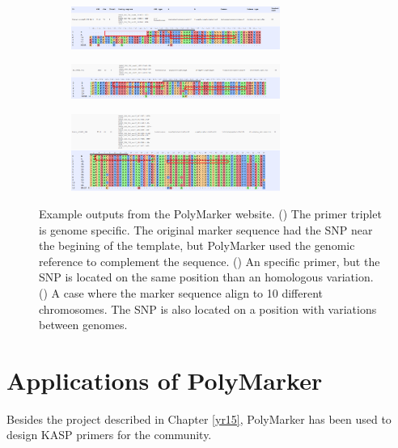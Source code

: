 \begin{figure}
\centering
\begin{subfigure}{1\textwidth}
\caption{}
\label{fig:poly:non-hom-sp}
\includegraphics[width=0.75\textwidth]{PolyMarker/Figures/website/non-hom-sp.png}
\end{subfigure}
\begin{subfigure}{1\textwidth}
\caption{}
\label{fig:poly:hom-sp}
\includegraphics[width=0.75\textwidth]{PolyMarker/Figures/website/hom-sp.png}
\end{subfigure}
\begin{subfigure}{1\textwidth}
\caption{}
\label{fig:poly:hom-multi}
\includegraphics[width=0.75\textwidth]{PolyMarker/Figures/website/hom-multi.png}
\end{subfigure}
\caption{Example outputs from the PolyMarker website. () The primer triplet is genome specific. The original marker sequence had the SNP near the begining of the template, but PolyMarker used the genomic reference to complement the sequence. () An specific primer, but the SNP is located on the same position than an homologous variation. () A case where the marker sequence align to 10 different chromosomes. The SNP is also located on a position with variations between genomes.}
\label{fig:poly:website}
\end{figure}


\section{Applications of PolyMarker}
Besides the project described in Chapter \ref{yr15}, PolyMarker has been used to design KASP primers for the community. 


